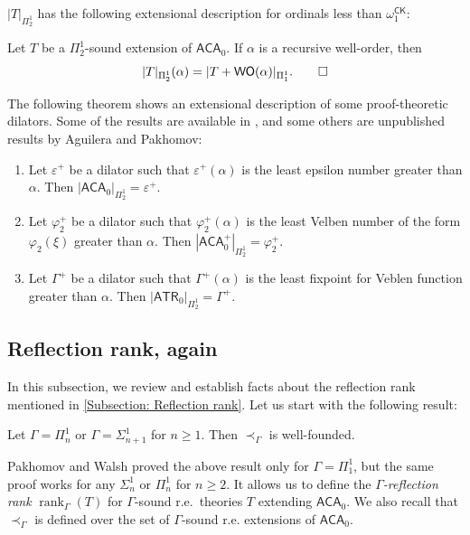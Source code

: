 \documentclass{mhkr}
\newcommand{\added}[1]{#1}
\newcommand{\rank}{\operatorname{rank}}
\newcommand{\WO}{\mathsf{WO}}
\newcommand{\CK}{\mathsf{CK}}
\newcommand{\ACA}{\mathsf{ACA}}
\newcommand{\ATR}{\mathsf{ATR}}
\begin{document}
$|T|_{\Pi^1_2}$ has the following extensional description for ordinals less than $\omega_1^\CK$:
\begin{theorem} \label{Theorem: Extensional behavior of Pi12 dilators below omega1CK}
\pushQED{\qed}
    Let $T$ be a $\Pi^1_2$-sound extension of $\ACA_0$.
    If $\alpha$ is a recursive well-order, then
    \begin{equation*}
        |T|_{\Pi^1_2}(\alpha)=|T+\WO(\alpha)|_{\Pi^1_1}. \qedhere 
    \end{equation*}
\end{theorem}

The following theorem shows an extensional description of some proof-theoretic dilators. Some of the results are available in \cite{PakhomovWalsh2023omegaReflection}, and some others are unpublished results by Aguilera and Pakhomov:
\begin{theorem} \pushQED{\qed} \phantom{a}
    \begin{enumerate}
        \item Let $\varepsilon^+$ be a dilator such that $\varepsilon^+(\alpha)$ is the least epsilon number greater than $\alpha$. Then $|\ACA_0|_{\Pi^1_2}=\varepsilon^+$.
        \item Let $\varphi_2^+$ be a dilator such that $\varphi_2^+(\alpha)$ is the least Velben number of the form $\varphi_2(\xi)$ greater than $\alpha$. Then $|\ACA^+_0|_{\Pi^1_2}=\varphi_2^+$.
        \item Let $\Gamma^+$ be a dilator such that $\Gamma^+(\alpha)$ is the least fixpoint for Veblen function greater than $\alpha$. Then $|\ATR_0|_{\Pi^1_2} = \Gamma^+$. 
        \qedhere 
    \end{enumerate}
\end{theorem}

\subsection{Reflection rank, again}
In this subsection, we review and establish facts about the reflection rank mentioned in \autoref{Subsection: Reflection rank}. Let us start with the following result:

\begin{theorem} \pushQED{\qed}
    Let $\Gamma=\Pi^1_n$ or $\Gamma=\Sigma^1_{n+1}$ for $n\ge 1$. Then $\prec_\Gamma$ is well-founded. \qedhere 
\end{theorem}
Pakhomov and Walsh \cite[Theorem 3.2]{PakhomovWalsh2021Reflection} \added{proved the above result only} for $\Gamma=\Pi^1_1$, but the same proof works for any $\Sigma^1_n$ or $\Pi^1_n$ for $n\ge 2$. It allows us to define the \emph{$\Gamma$-reflection rank} $\rank_\Gamma(T)$ for $\Gamma$-sound r.e.\ theories $T$ extending $\ACA_0$. We also recall that $\prec_\Gamma$ is defined over the set of $\Gamma$-sound r.e. extensions of $\ACA_0$.
\end{document}
